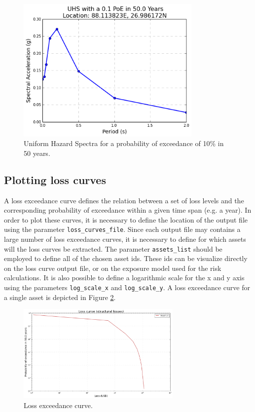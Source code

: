 \begin{figure}[htb]
  \centering
      \includegraphics[width=9cm]{figures/UHS.png}
  \caption{Uniform Hazard Spectra for a probability of exceedance of 10\% in 50 years.}
  \label{fig:UHS}
\end{figure}

\subsection{Plotting loss curves}
\label{subsec:plot-loss_curves}
A loss exceedance curve defines the relation between a set of loss levels and the corresponding probability of exceedance within a given time span (e.g. a year). In order to plot these curves, it is necessary to define the location of the output file using the parameter \verb=loss_curves_file=. Since each output file may contains a large number of loss exceedance curves, it is necessary to define for which assets will the loss curves be extracted. The parameter \verb=assets_list= should be employed to define all of the chosen asset ids. These ids can be visualize directly on the loss curve output file, or on the exposure model used for the risk calculations. It is also possible to define a logarithmic scale for the x and y axis using the parameters \verb=log_scale_x= and \verb=log_scale_y=. A loss exceedance curve for a single asset is depicted in Figure \ref{fig:loss_curve}.

\begin{figure}[htb]
  \centering
      \includegraphics[width=8cm]{figures/loss_curve.png}
  \caption{Loss exceedance curve.}
  \label{fig:loss_curve}
\end{figure}